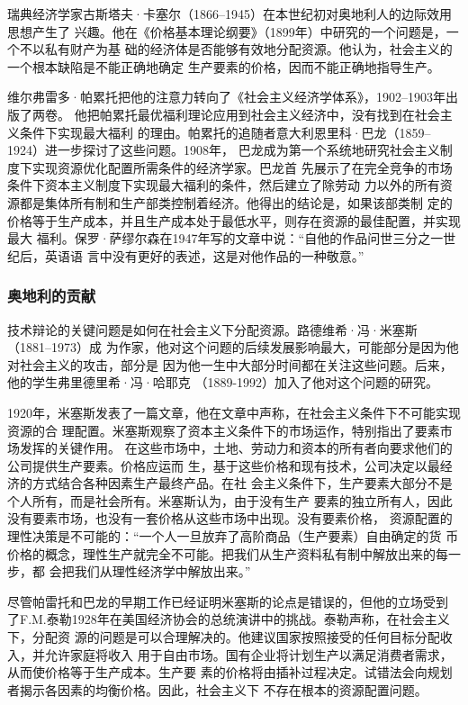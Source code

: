 瑞典经济学家古斯塔夫·卡塞尔（1866--1945）在本世纪初对奥地利人的边际效用思想产生了
兴趣。他在《价格基本理论纲要》（1899年）中研究的一个问题是，一个不以私有财产为基
础的经济体是否能够有效地分配资源。他认为，社会主义的一个根本缺陷是不能正确地确定
生产要素的价格，因而不能正确地指导生产。


维尔弗雷多·帕累托把他的注意力转向了《社会主义经济学体系》，1902--1903年出版了两卷。
他把帕累托最优福利理论应用到社会主义经济中，没有找到在社会主义条件下实现最大福利
的理由。帕累托的追随者意大利恩里科·巴龙（1859--1924）进一步探讨了这些问题。1908年，
巴龙成为第一个系统地研究社会主义制度下实现资源优化配置所需条件的经济学家。巴龙首
先展示了在完全竞争的市场条件下资本主义制度下实现最大福利的条件，然后建立了除劳动
力以外的所有资源都是集体所有制和生产部类控制着经济。他得出的结论是，如果该部类制
定的价格等于生产成本，并且生产成本处于最低水平，则存在资源的最佳配置，并实现最大
福利。保罗·萨缪尔森在1947年写的文章中说：“自他的作品问世三分之一世纪后，英语语
言中没有更好的表述，这是对他作品的一种敬意。”

\subsubsection{奥地利的贡献}

技术辩论的关键问题是如何在社会主义下分配资源。路德维希·冯·米塞斯（1881--1973）成
为作家，他对这个问题的后续发展影响最大，可能部分是因为他对社会主义的攻击，部分是
因为他一生中大部分时间都在关注这些问题。后来，他的学生弗里德里希·冯·哈耶克
（1889-1992）加入了他对这个问题的研究。


1920年，米塞斯发表了一篇文章，他在文章中声称，在社会主义条件下不可能实现资源的合
理配置。米塞斯观察了资本主义条件下的市场运作，特别指出了要素市场发挥的关键作用。
在这些市场中，土地、劳动力和资本的所有者向要求他们的公司提供生产要素。价格应运而
生，基于这些价格和现有技术，公司决定以最经济的方式结合各种因素生产最终产品。在社
会主义条件下，生产要素大部分不是个人所有，而是社会所有。米塞斯认为，由于没有生产
要素的独立所有人，因此没有要素市场，也没有一套价格从这些市场中出现。没有要素价格，
资源配置的理性决策是不可能的：“一个人一旦放弃了高阶商品（生产要素）自由确定的货
币价格的概念，理性生产就完全不可能。把我们从生产资料私有制中解放出来的每一步，都
会把我们从理性经济学中解放出来。”

尽管帕雷托和巴龙的早期工作已经证明米塞斯的论点是错误的，但他的立场受到
了F.M.泰勒1928年在美国经济协会的总统演讲中的挑战。泰勒声称，在社会主义下，分配资
源的问题是可以合理解决的。他建议国家按照接受的任何目标分配收入，并允许家庭将收入
用于自由市场。国有企业将计划生产以满足消费者需求，从而使价格等于生产成本。生产要
素的价格将由插补过程决定。试错法会向规划者揭示各因素的均衡价格。因此，社会主义下
不存在根本的资源配置问题。


